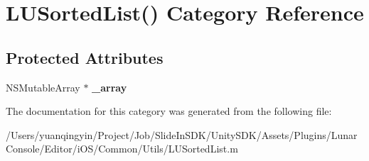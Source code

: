 \hypertarget{category_l_u_sorted_list_07_08}{}\section{L\+U\+Sorted\+List() Category Reference}
\label{category_l_u_sorted_list_07_08}
\subsection*{Protected Attributes}
\begin{DoxyCompactItemize}
\item 
\mbox{\label{category_l_u_sorted_list_07_08_abc60462fe91e206c9a5f213993415609}} 
N\+S\+Mutable\+Array $\ast$ {\bfseries \+\_\+array}
\end{DoxyCompactItemize}


The documentation for this category was generated from the following file\+:\begin{DoxyCompactItemize}
\item 
/\+Users/yuanqingyin/\+Project/\+Job/\+Slide\+In\+S\+D\+K/\+Unity\+S\+D\+K/\+Assets/\+Plugins/\+Lunar\+Console/\+Editor/i\+O\+S/\+Common/\+Utils/L\+U\+Sorted\+List.\+m\end{DoxyCompactItemize}
